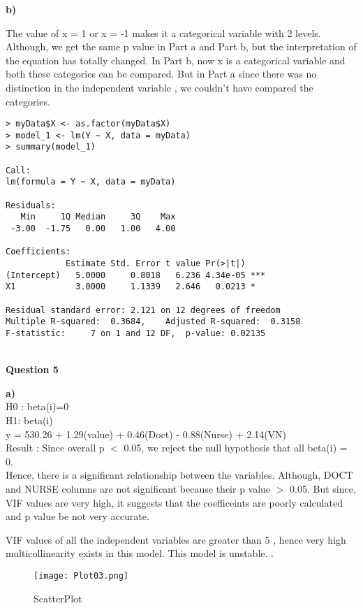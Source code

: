 \documentclass[12pt,letterpaper]{article}
\begin{document}
\textbf{{b)}}

The value of x = 1 or x = -1 makes it a categorical variable with 2 levels. \\

Although, we get the same p value in Part a and Part b, but the interpretation of the equation has totally changed. In Part b, now x is a categorical variable and both these categories can be compared. But in Part a since there was no distinction in the  independent variable , we couldn't have compared the categories.
\\
\begin{lstlisting}[label=R Code,caption=Q4 (b) R Code Output]
> myData$X <- as.factor(myData$X)
> model_1 <- lm(Y ~ X, data = myData)
> summary(model_1)

Call:
lm(formula = Y ~ X, data = myData)

Residuals:
   Min     1Q Median     3Q    Max 
 -3.00  -1.75   0.00   1.00   4.00 

Coefficients:
            Estimate Std. Error t value Pr(>|t|)    
(Intercept)   5.0000     0.8018   6.236 4.34e-05 ***
X1            3.0000     1.1339   2.646   0.0213 *  

Residual standard error: 2.121 on 12 degrees of freedom
Multiple R-squared:  0.3684,	Adjusted R-squared:  0.3158 
F-statistic:     7 on 1 and 12 DF,  p-value: 0.02135
\end{lstlisting}\\

{\Large \textbf{Question 5}} 

\textbf{{a)}}\\
H0 : beta(i)=0\\
H1: beta(i)  \\

y = 530.26 + 1.29(value) + 0.46(Doct) - 0.88(Nurse) + 2.14(VN)\\

Result : Since overall p $<$  0.05, we reject the null hypothesis that all beta(i) = 0. \\
Hence, there is a significant relationship between the variables.
Although, DOCT and NURSE columns are not significant because their p value $>$ 0.05. But since, VIF values are very high, it suggests that the coefficeints are poorly calculated and p value be not very accurate. 

VIF values of all the independent variables are greater than 5 , hence very high multicollinearity exists in this model. This model is unstable.
. 
\begin{figure}[!h]
   \centering
    \texttt{[image: Plot03.png]}
    \caption{ScatterPlot}
    \end{figure}
\end{document}
